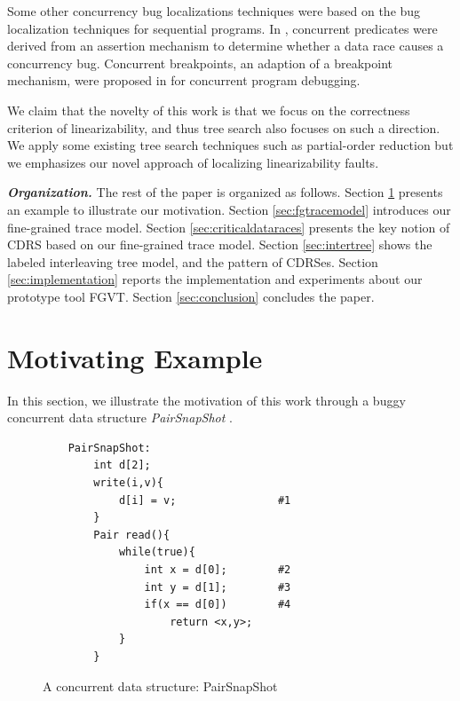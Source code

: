 \documentclass[runningheads]{llncs}
\begin{document}
Some other concurrency bug localizations techniques were based on the bug localization techniques for sequential programs. In \cite{DBLP:conf/IEEEpact/GottschlichPPW13}, concurrent predicates were derived from an assertion mechanism to determine whether a data race causes a concurrency bug. Concurrent breakpoints, an adaption of a breakpoint mechanism, were proposed in \cite{DBLP:conf/ppopp/ParkS12} for concurrent program debugging.

We claim that the novelty of this work is that we focus on the correctness criterion of linearizability, and thus tree search also focuses on such a direction. We apply some 
existing tree search techniques such as partial-order reduction but we emphasizes our novel approach of localizing linearizability faults.


\noindent\textbf{\textit{Organization.}} The rest of the paper is organized as follows. Section \ref{sec:motivatingeg} presents an example to illustrate our motivation. Section \ref{sec:fgtracemodel} introduces our fine-grained trace model. Section \ref{sec:criticaldataraces} presents the key notion of CDRS based on our fine-grained trace model. Section \ref{sec:intertree} shows the labeled interleaving tree model, and the pattern of CDRSes. Section \ref{sec:implementation} reports the implementation and experiments about our prototype tool FGVT. Section \ref{sec:conclusion} concludes the paper.

\section{Motivating Example}\label{sec:motivatingeg}

In this section, we illustrate the motivation of this work through a buggy concurrent data structure \textit{PairSnapShot} \cite{DBLP:conf/sac/LongZ16}.

\begin{figure}
\centering
    \begin{small}
 \vspace{-0.8cm}
        \begin{verbatim}
    PairSnapShot:
        int d[2];
        write(i,v){
            d[i] = v;                #1
        }
        Pair read(){
            while(true){
                int x = d[0];        #2
                int y = d[1];        #3
                if(x == d[0])        #4
                    return <x,y>;
            }
        }
        \end{verbatim}
        \vspace{-1cm}
        \end{small}
        \caption{A concurrent data structure: PairSnapShot}
        \label{fig:pairsnapshot}
\end{figure}
\end{document}
